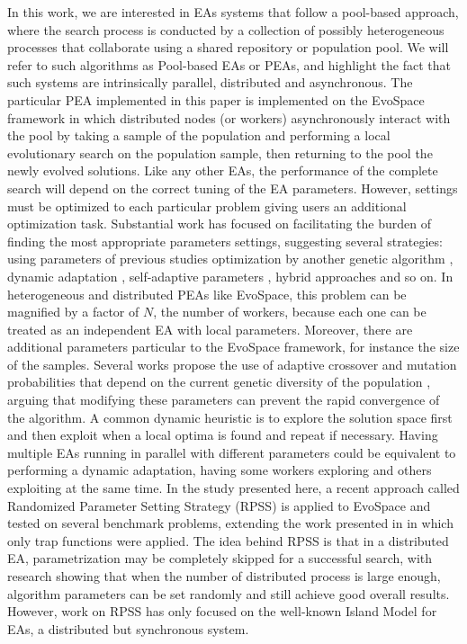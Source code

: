 \documentclass{llncs}
\begin{document}
In this work, we are interested in EAs systems that follow a
pool-based approach, where the search process is conducted by a
collection of possibly heterogeneous processes that collaborate using
a shared repository or population pool. We will refer to such
algorithms as Pool-based EAs or PEAs, and highlight the fact that such
systems are intrinsically parallel, distributed and asynchronous.
The particular PEA implemented in this paper is implemented on 
the EvoSpace framework  \cite{GValdez2015}
in which distributed nodes (or workers) asynchronously interact 
with the pool by taking a sample of the population and performing 
a local evolutionary search on the population sample, then returning 
to the pool the newly evolved solutions. 
Like any other EAs, the performance of the complete search will depend
on the correct tuning of the EA parameters. However, settings 
must be optimized to each particular problem \cite{de2007parameter}  
giving users an additional optimization task. 
Substantial work has focused on facilitating the burden of finding 
the most appropriate parameters settings, suggesting several strategies:
using parameters of previous studies \cite{eiben1999parameter} 
optimization by another genetic algorithm \cite{grefenstette1986optimization}, dynamic adaptation \cite{eiben1999parameter}, 
self-adaptive parameters \cite{pellerin2004self}, hybrid approaches and so on.
In heterogeneous and distributed PEAs like EvoSpace, this problem can 
be magnified by a factor of $N$, the number of workers, because each one
can be treated as an independent EA with local parameters. Moreover, there
are additional parameters particular to the EvoSpace framework, 
for instance the size of the samples.
Several works propose the use of adaptive crossover and mutation probabilities
that depend on the current genetic diversity of the population \cite{pellerin2004self},
arguing that modifying these parameters can prevent the rapid convergence of the 
algorithm. 
A common dynamic heuristic is to explore the solution space first and then exploit
when a local optima is found and repeat if necessary.  
Having multiple EAs running in parallel with different parameters could be 
equivalent to performing a dynamic adaptation, having some workers exploring
and others exploiting at the same time. 
In the study presented here, a recent approach called Randomized Parameter
Setting Strategy (RPSS) \cite{fuku1,fuku2} is applied to EvoSpace and tested on 
several benchmark problems, extending the work presented in \cite{garcia2014randomized} 
in which only trap functions were applied.
The idea behind RPSS is that in a distributed EA, parametrization may be
completely skipped for a successful search, with research showing that when the 
number of distributed process is large enough, algorithm parameters can be set 
randomly and still achieve good overall results. However, work on RPSS has 
only focused on the well-known Island Model for EAs, a distributed but synchronous system.
\end{document}
